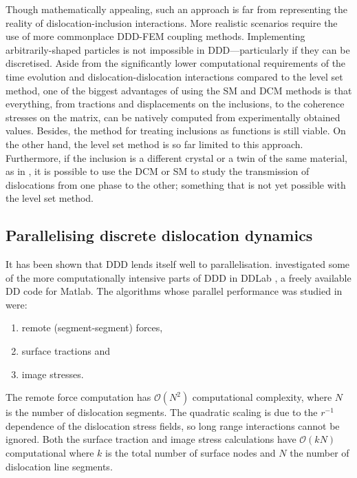 Though mathematically appealing, such an approach is far from representing the reality of dislocation-inclusion interactions. More realistic scenarios require the use of more commonplace DDD-FEM coupling methods. Implementing arbitrarily-shaped particles is not impossible in DDD---particularly if they can be discretised. Aside from the significantly lower computational requirements of the time evolution and dislocation-dislocation interactions compared to the level set method, one of the biggest advantages of using the SM and DCM methods is that everything, from tractions and displacements on the inclusions, to the coherence stresses on the matrix, can be natively computed from experimentally obtained values. Besides, the method for treating inclusions as functions is still viable. On the other hand, the level set method is so far limited to this approach. Furthermore, if the inclusion is a different crystal or a twin of the same material, as in \cite{twinning}, it is possible to use the DCM or SM to study the transmission of dislocations from one phase to the other; something that is not yet possible with the level set method.

\subsection{Parallelising discrete dislocation dynamics}
\label{ss:parallel_ddd}

It has been shown that DDD lends itself well to parallelisation.  investigated some of the more computationally intensive parts of DDD in DDLab \cite{ddlab}, a freely available DD code for Matlab. The algorithms whose parallel performance was studied in \cite{gpu_ddd} were:
\begin{enumerate}
  \item remote (segment-segment) forces,
  \item surface tractions and
  \item image stresses.
\end{enumerate}
The remote force computation has $ \mathcal{O}(N^{2}) $ computational complexity, where $ N $ is the number of dislocation segments. The quadratic scaling is due to the $ r^{-1} $ dependence of the dislocation stress fields, so long range interactions cannot be ignored. Both the surface traction and image stress calculations have $ \mathcal{O}(k N) $ computational where $ k $ is the total number of surface nodes and $ N $ the number of dislocation line segments.

